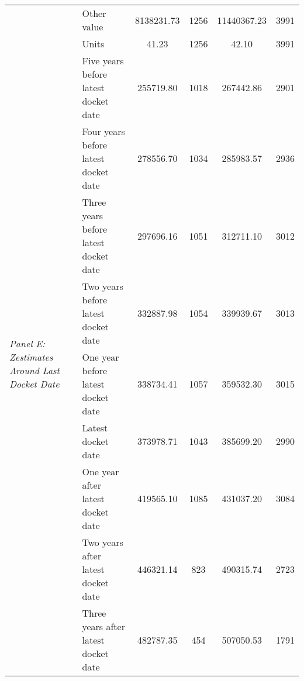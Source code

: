\begin{tabular}{llcccc}
 & Other value & 8138231.73 & 1256 & 11440367.23 & 3991 \\
 & Units & 41.23 & 1256 & 42.10 & 3991 \\
\cline{1-6}
\multirow[c]{9}{4cm}{\textit{Panel E: Zestimates Around Last Docket Date}} & Five years before latest docket date & 255719.80 & 1018 & 267442.86 & 2901 \\
 & Four years before latest docket date & 278556.70 & 1034 & 285983.57 & 2936 \\
 & Three years before latest docket date & 297696.16 & 1051 & 312711.10 & 3012 \\
 & Two years before latest docket date & 332887.98 & 1054 & 339939.67 & 3013 \\
 & One year before latest docket date & 338734.41 & 1057 & 359532.30 & 3015 \\
 & Latest docket date & 373978.71 & 1043 & 385699.20 & 2990 \\
 & One year after latest docket date & 419565.10 & 1085 & 431037.20 & 3084 \\
 & Two years after latest docket date & 446321.14 & 823 & 490315.74 & 2723 \\
 & Three years after latest docket date & 482787.35 & 454 & 507050.53 & 1791 \\
\cline{1-6}
\bottomrule
\end{tabular}
